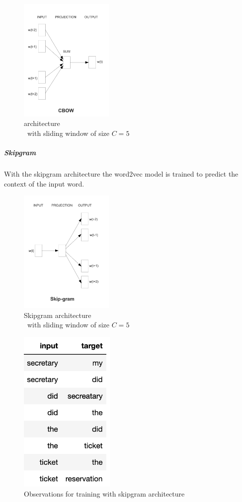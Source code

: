 		\begin{figure}[ht]
			\centering
			\includegraphics[height=6cm]{Bilder/word2vec/architecture_cbow.png}
			\caption{ architecture\\\ with sliding window of size $C=5$ }
			\label{fig:cbow-architecture}
		\end{figure}
	
		\subparagraph{Skipgram} 
		With the skipgram architecture the word2vec model is trained to predict the context of the input word.
		
		\begin{figure}[ht]
			\centering
			\includegraphics[height=6cm]{Bilder/word2vec/architecture_skipgram.png}
			\caption{Skipgram architecture\\\ with sliding window of size $C=5$ }
			\label{fig:cbow-architecture}
		\end{figure}
	
		\begin{figure}[ht]
			\centering
			\includegraphics[height=8cm]{Bilder/word2vec/skipgram.png}
			\caption{Observations for training with skipgram architecture}
			\label{fig:cbow-architecture}
		\end{figure}
		
